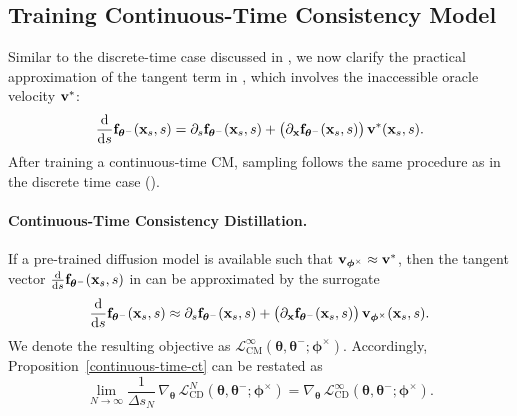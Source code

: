 \subsection{Training Continuous-Time Consistency Model}
Similar to the discrete-time case discussed in , 
we now clarify the practical approximation of the tangent term in 
, which involves the inaccessible oracle velocity ${\mathbf{v}}^*$:
\begin{align*}
    \frac{\mathop{}\!\mathrm{d}}{\mathop{}\!\mathrm{d} s}{\mathbf{f}}_{{\bm{\theta}}^-}({\mathbf{x}}_s,s)
    = \partial_s {\mathbf{f}}_{{\bm{\theta}}^-}({\mathbf{x}}_s,s)
    + \big(\partial_{{\mathbf{x}}}{\mathbf{f}}_{{\bm{\theta}}^-}({\mathbf{x}}_s,s)\big)\,{\mathbf{v}}^*({\mathbf{x}}_s,s).
\end{align*}
After training a continuous-time CM, sampling follows the same procedure as in
the discrete time case ().

\paragraph{Continuous-Time Consistency Distillation.}
If a pre-trained diffusion model is available such that
${\mathbf{v}}_{\bm{\phi}^\times} \approx {\mathbf{v}}^*$, then the tangent vector
$\tfrac{\mathop{}\!\mathrm{d}}{\mathop{}\!\mathrm{d} s}{\mathbf{f}}_{{\bm{\theta}}^-}({\mathbf{x}}_s,s)$ in
 can be approximated by the surrogate
\begin{align}\label{eq:cd-continuous-time}
    \frac{\mathop{}\!\mathrm{d}}{\mathop{}\!\mathrm{d} s}{\mathbf{f}}_{{\bm{\theta}}^-}({\mathbf{x}}_s,s) 
     \approx 
    \partial_s {\mathbf{f}}_{{\bm{\theta}}^-}({\mathbf{x}}_s,s)
    + \big(\partial_{{\mathbf{x}}}{\mathbf{f}}_{{\bm{\theta}}^-}({\mathbf{x}}_s,s)\big)\,
      {\mathbf{v}}_{\bm{\phi}^\times}({\mathbf{x}}_s,s).
\end{align}
We denote the resulting objective as
$\mathcal{L}^\infty_{\mathrm{CM}}(\bm{\theta},\bm{\theta}^-;\bm{\phi}^\times)$.
Accordingly, Proposition~\ref{continuous-time-ct} can be restated as
\[
\lim_{N\to\infty} 
\frac{1}{\Delta s_N}\,\nabla_{\bm{\theta}}\,
\mathcal{L}_{\mathrm{CD}}^{N}(\bm{\theta},\bm{\theta}^-;\bm{\phi}^\times)
= 
\nabla_{\bm{\theta}}\,
\mathcal{L}_{\mathrm{CD}}^{\infty}(\bm{\theta},\bm{\theta}^-;\bm{\phi}^\times).
\]


